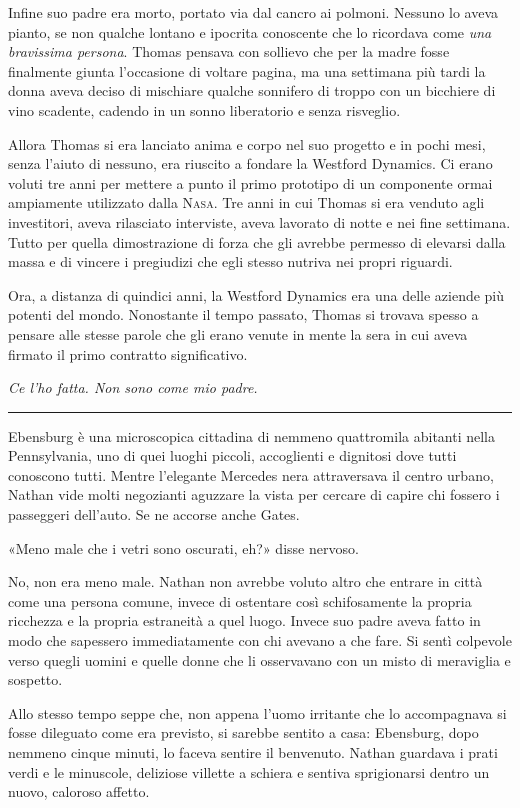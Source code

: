 \documentclass[a4paper,oneside,11pt]{memoir}
\begin{document}
Infine suo padre era morto, portato via dal cancro ai polmoni. Nessuno lo aveva
pianto, se non qualche lontano e ipocrita conoscente che lo ricordava come
\emph{una bravissima persona}. Thomas pensava con sollievo che per la madre
fosse finalmente giunta l'occasione di voltare pagina, ma una settimana più
tardi la donna aveva deciso di mischiare qualche sonnifero di troppo con un
bicchiere di vino scadente, cadendo in un sonno liberatorio e senza risveglio.

Allora Thomas si era lanciato anima e corpo nel suo progetto e in pochi mesi,
senza l'aiuto di nessuno, era riuscito a fondare la Westford Dynamics. Ci erano
voluti tre anni per mettere a punto il primo prototipo di un componente ormai
ampiamente utilizzato dalla {\scshape Nasa}. Tre anni in cui Thomas si era
venduto agli investitori, aveva rilasciato interviste, aveva lavorato di notte e
nei fine settimana. Tutto per quella dimostrazione di forza che gli avrebbe
permesso di elevarsi dalla massa e di vincere i pregiudizi che egli stesso
nutriva nei propri riguardi.

Ora, a distanza di quindici anni, la Westford Dynamics era una delle aziende più
potenti del mondo. Nonostante il tempo passato, Thomas si trovava spesso a
pensare alle stesse parole che gli erano venute in mente la sera in cui aveva
firmato il primo contratto significativo.

\emph{Ce l'ho fatta. Non sono come mio padre.}

\plainbreak{1}

Ebensburg è una microscopica cittadina di nemmeno quattromila abitanti nella
Pennsylvania, uno di quei luoghi piccoli, accoglienti e dignitosi dove tutti
conoscono tutti. Mentre l'elegante Mercedes nera attraversava il centro urbano,
Nathan vide molti negozianti aguzzare la vista per cercare di capire chi fossero
i passeggeri dell'auto. Se ne accorse anche Gates.

«Meno male che i vetri sono oscurati, eh?» disse nervoso.

No, non era meno male. Nathan non avrebbe voluto altro che entrare in città come
una persona comune, invece di ostentare così schifosamente la propria ricchezza
e la propria estraneità a quel luogo. Invece suo padre aveva fatto in modo che
sapessero immediatamente con chi avevano a che fare. Si sentì colpevole verso
quegli uomini e quelle donne che li osservavano con un misto di meraviglia e
sospetto.

Allo stesso tempo seppe che, non appena l'uomo irritante che lo accompagnava si
fosse dileguato come era previsto, si sarebbe sentito a casa: Ebensburg, dopo
nemmeno cinque minuti, lo faceva sentire il benvenuto. Nathan guardava i prati
verdi e le minuscole, deliziose villette a schiera e sentiva sprigionarsi dentro
un nuovo, caloroso affetto.
\end{document}

